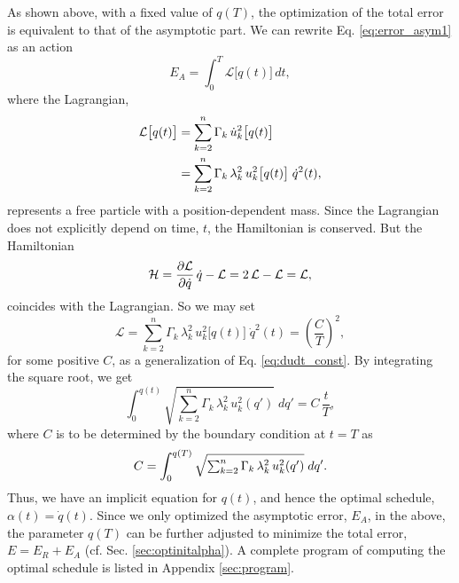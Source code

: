 \documentclass[reprint, floatfix]{revtex4-1}
\newcommand{\Err}{E}
\begin{document}
As shown above, with a fixed value of $q(T)$,
the optimization of the total error is equivalent to
that of the asymptotic part.
%
We can rewrite Eq. \eqref{eq:error_asym1} as an action
%
\begin{equation}
  \Err_A
  =
  \int_0^T
    {\mathcal L} \bigl[ q(t)\bigr]
    \, dt
  ,
\label{eq:error_asym_Lagrangian}
\end{equation}
%
where the Lagrangian,
%
\begin{align}
  {\mathcal L} \bigl[ q(t) \bigr]
  &=
  \sum_{ k = 2 }^n
    \Gamma_k \, \dot u_k^2\bigl[ q(t) \bigr]
  \notag
  \\
  &=
  \sum_{ k = 2 }^n
    \Gamma_k \, \lambda_k^2 \, u_k^2 \bigl[ q(t) \bigr]
  \; \dot q^2( t ),
\notag
\end{align}
%
represents a free particle
with a position-dependent mass.
%
Since the Lagrangian
does not explicitly depend on time, $t$,
the Hamiltonian is conserved.
%
But the Hamiltonian
%
\begin{equation}
  \mathcal H
  =
  \frac{ \partial \mathcal L }
       { \partial \dot q     }
  \, \dot q
  -
  \mathcal L
  =
  2 \, \mathcal L
  - \mathcal L
  =
  \mathcal L,
  \notag
\end{equation}
%
coincides with the Lagrangian.
%
So we may set
%
\begin{equation}
  \mathcal L
  =
    \sum_{ k = 2 }^n
      \Gamma_k \, \lambda_k^2
      \, u_k^2 \bigl[ q(t) \bigr]
  \;
  \dot q^2(t)
  =
  \left(
    \frac C T
  \right)^2
  ,
  \label{eq:Lagrangian_const}
\end{equation}
%
for some positive $C$,
%
as a generalization of Eq. \eqref{eq:dudt_const}.
%
By integrating the square root, we get
%
\begin{equation}
  \int_{ 0 }^{ q(t) }
    \sqrt{
      \textstyle\sum_{ k = 2 }^n
        \Gamma_k \, \lambda_k^2
        \, u_k^2( q' )
    }
    \;
    d q'
  =
  C \, \frac t T
  ,
  \label{eq:q_opt}
\end{equation}
%
where $C$ is to be determined by
the boundary condition at $t = T$ as
%
\begin{equation}
  C =
  \int_{ 0 }^{ q(T) }
    \sqrt{
      \textstyle\sum_{ k = 2 }^n
        \Gamma_k \, \lambda_k^2
        \, u_k^2( q' )
    }
    \;
    d q'
  .
  \notag
\end{equation}
%
Thus, we have an implicit equation for $q(t)$,
and hence the optimal schedule,
$\alpha(t) = \dot q(t)$.
%
Since we only optimized the asymptotic error, $E_A$,
in the above,
the parameter $q(T)$ can be further adjusted
to minimize the total error, $E = E_R + E_A$
(cf. Sec. \ref{sec:optinitalpha}).
%
A complete program of computing the optimal schedule
is listed in Appendix \ref{sec:program}.
\end{document}
